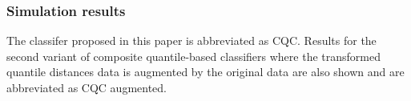 

\subsubsection{Simulation results}
\label{sec:simulation-results}

The classifer proposed in this paper is abbreviated as CQC.  Results for the
second variant of composite quantile-based classifiers where the transformed
quantile distances data is augmented by the original data are also shown and are
abbreviated as CQC augmented.

